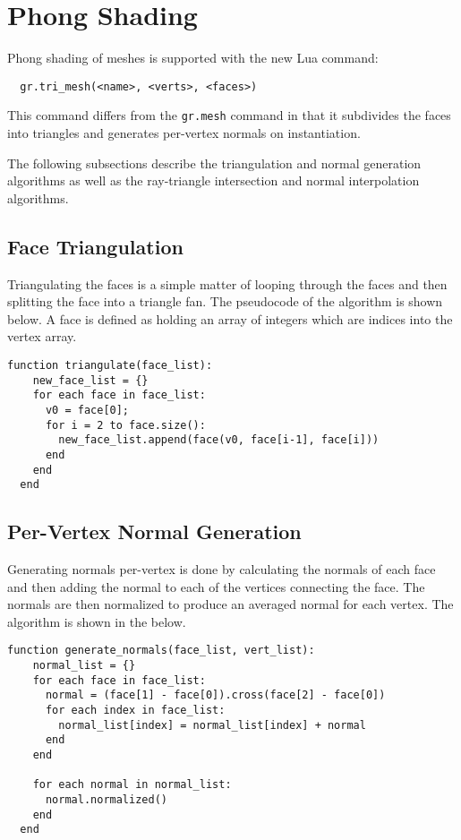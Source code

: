 \section{Phong Shading}

Phong shading of meshes is supported with the new Lua command:
\begin{lstlisting}
  gr.tri_mesh(<name>, <verts>, <faces>)
\end{lstlisting}
This command differs from the \verb|gr.mesh| command in that it subdivides the
faces into triangles and generates per-vertex normals on instantiation.

The following subsections describe the triangulation and normal generation
algorithms as well as the ray-triangle intersection and normal interpolation
algorithms. 

\subsection{Face Triangulation}
Triangulating the faces is a simple matter of looping through the faces and then
splitting the face into a triangle fan. The pseudocode of the algorithm is shown
below. A face is defined as holding an array of integers which are indices into
the vertex array.

\begin{lstlisting}[caption={Mesh face triangulation}]
  function triangulate(face_list):
    new_face_list = {}
    for each face in face_list:
      v0 = face[0];
      for i = 2 to face.size():
        new_face_list.append(face(v0, face[i-1], face[i]))
      end
    end
  end
\end{lstlisting}

\subsection{Per-Vertex Normal Generation}
Generating normals per-vertex is done by calculating the normals of each face
and then adding the normal to each of the vertices connecting the face. The
normals are then normalized to produce an averaged normal for each vertex. The
algorithm is shown in the below.

\begin{lstlisting}[caption={Generating per-vertex normals}]
  function generate_normals(face_list, vert_list):
    normal_list = {}
    for each face in face_list:
      normal = (face[1] - face[0]).cross(face[2] - face[0])
      for each index in face_list:
        normal_list[index] = normal_list[index] + normal
      end
    end

    for each normal in normal_list:
      normal.normalized()
    end
  end
\end{lstlisting}

